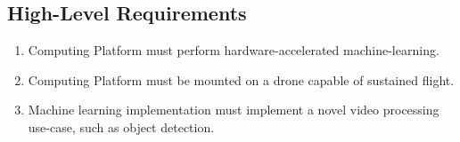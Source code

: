 \documentclass[10pt,letterpaper]{article}
\begin{document}
\subsection{High-Level Requirements}
\begin{enumerate}[label=F.HL.\arabic*, wide=1cm, widest=3cm, leftmargin=*, font=\bfseries, noitemsep,topsep=0pt, parsep=4pt, partopsep=0pt]
    \item Computing Platform must perform hardware-accelerated machine-learning.
    \item Computing Platform must be mounted on a drone capable of sustained flight.
    \item Machine learning implementation must implement a novel video processing use-case, such as object detection.
\end{enumerate}
\end{document}
